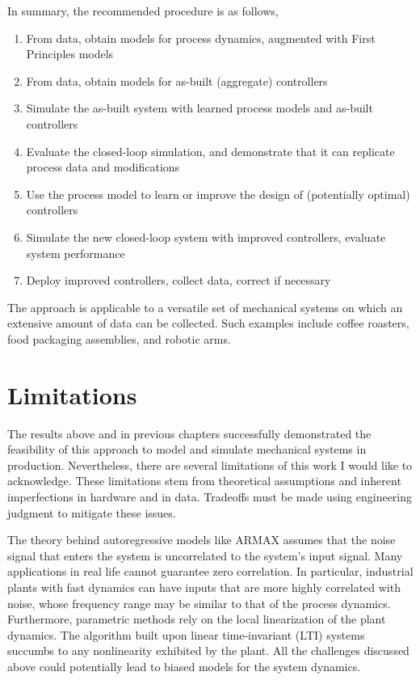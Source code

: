 In summary, the recommended procedure is as follows, 

\begin{enumerate}
    \item From data, obtain models for process dynamics, augmented with First Principles models
    \item From data, obtain models for as-built (aggregate) controllers 
    \item Simulate the as-built system with learned process models and as-built controllers
    \item Evaluate the closed-loop simulation, and demonstrate that it can replicate process data and modifications
    \item Use the process model to learn or improve the design of (potentially optimal) controllers 
    \item Simulate the new closed-loop system with improved controllers, evaluate system performance
    \item Deploy improved controllers, collect data, correct if necessary
\end{enumerate}

The approach is applicable to a versatile set of mechanical systems on which an extensive amount of data can be collected. Such examples include coffee roasters, food packaging assemblies, and robotic arms. 

\section{Limitations} \label{ch:res:lim}

The results above and in previous chapters successfully demonstrated the feasibility of this approach to model and simulate mechanical systems in production. Nevertheless, there are several limitations of this work I would like to acknowledge. These limitations stem from theoretical assumptions and inherent imperfections in hardware and in data. Tradeoffs must be made using engineering judgment to mitigate these issues. 

The theory behind autoregressive models like ARMAX assumes that the noise signal that enters the system is uncorrelated to the system's input signal. Many applications in real life cannot guarantee zero correlation. In particular, industrial plants with fast dynamics can have inputs that are more highly correlated with noise, whose frequency range may be similar to that of the process dynamics. Furthermore, parametric methods rely on the local linearization of the plant dynamics. The algorithm built upon linear time-invariant (LTI) systems succumbs to any nonlinearity exhibited by the plant. All the challenges discussed above could potentially lead to biased models for the system dynamics.

